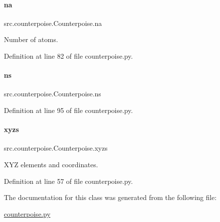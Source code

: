 \paragraph{\texorpdfstring{na}{na}}
{\footnotesize\ttfamily src.\+counterpoise.\+Counterpoise.\+na}



Number of atoms. 



Definition at line 82 of file counterpoise.\+py.

\mbox{\label{classsrc_1_1counterpoise_1_1Counterpoise_aeff7f3fb18a029eec7b6bb52979fd58f}} 
\paragraph{\texorpdfstring{ns}{ns}}
{\footnotesize\ttfamily src.\+counterpoise.\+Counterpoise.\+ns}



Definition at line 95 of file counterpoise.\+py.

\mbox{\label{classsrc_1_1counterpoise_1_1Counterpoise_ad1e40b97146b0e240aa165177d92a35f}} 
\paragraph{\texorpdfstring{xyzs}{xyzs}}
{\footnotesize\ttfamily src.\+counterpoise.\+Counterpoise.\+xyzs}



X\+YZ elements and coordinates. 



Definition at line 57 of file counterpoise.\+py.



The documentation for this class was generated from the following file\+:\begin{DoxyCompactItemize}
\item 
\hyperlink{counterpoise_8py}{counterpoise.\+py}\end{DoxyCompactItemize}
